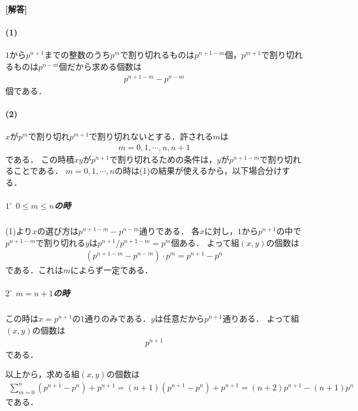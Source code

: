 \documentclass[../../main.tex]{subfiles}
\begin{document}
\begin{oframed}
  
\end{oframed}

{\bf [解答]}
\paragraph{(1)}

$1$から$p^{n+1}$までの整数のうち$p^m$で割り切れるものは$p^{n+1-m}$個，$p^{m+1}$で割り切れるものは$p^{n-m}$個だから求める個数は
\begin{align}
  p^{n+1-m}-p^{n-m} \label{eq:1}
\end{align}
個である．

\paragraph{(2)}

$x$が$p^m$で割り切れ$p^{m+1}$で割り切れないとする．許される$m$は
\begin{align}
  m = 0,1,\cdots,n,n+1 \label{eq:2}
\end{align}
である．
この時積$xy$が$p^{n+1}$で割り切れるための条件は，$y$が$p^{n+1-m}$で割り切れることである．
$m=0,1,\cdots,n$の時は(1)の結果が使えるから，以下場合分けする．

\subparagraph{$1^\circ$ $0\le m\le n$の時}

(1)より$x$の選び方は$p^{n+1-m}-p^{n-m}$通りである．
各$x$に対し，$1$から$p^{n+1}$の中で$p^{n+1-m}$で割り切れる$y$は$p^{n+1}/p^{n+1-m}=p^m$個ある．
よって組$(x,y)$の個数は
\begin{align}
  (p^{n+1-m}-p^{n-m})\cdot p^m=p^{n+1}-p^n \label{eq:3}
\end{align}
である．これは$m$によらず一定である．

\subparagraph{$2^\circ$ $m=n+1$の時}

この時は$x=p^{n+1}$の$1$通りのみである．$y$は任意だから$p^{n+1}$通りある．
よって組$(x,y)$の個数は
\begin{align}
  p^{n+1}
\end{align}
である．
\casesend

以上から，求める組$(x,y)$の個数は
\begin{align}
  \sum_{m=0}^n(p^{n+1}-p^n)+p^{n+1} =(n+1)(p^{n+1}-p^n)+p^{n+1}=(n+2)p^{n+1}-(n+1)p^n
\end{align}
である．

\newpage
\end{document}
